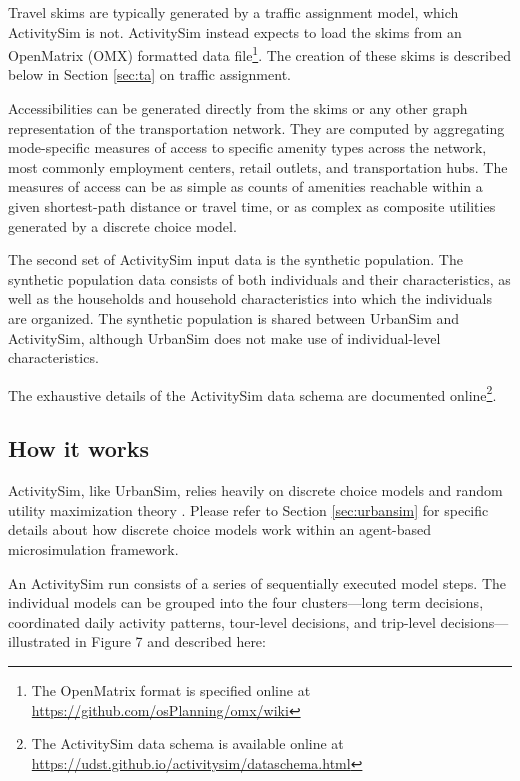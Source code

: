 Travel skims are typically generated by a traffic assignment model, which ActivitySim is not. ActivitySim instead expects to load the skims from an OpenMatrix (OMX) formatted data file\footnote{The OpenMatrix format is specified online at \url{https://github.com/osPlanning/omx/wiki}}. The creation of these skims is described below in Section \ref{sec:ta} on traffic assignment.

Accessibilities can be generated directly from the skims or any other graph representation of the transportation network. They are computed by aggregating mode-specific measures of access to specific amenity types across the network, most commonly employment centers, retail outlets, and transportation hubs. The measures of access can be as simple as counts of amenities reachable within a given shortest-path distance or travel time, or as complex as composite utilities generated by a discrete choice model. 

The second set of ActivitySim input data is the synthetic population. The synthetic population data consists of both individuals and their characteristics, as well as the households and household characteristics into which the individuals are organized. The synthetic population is shared between UrbanSim and ActivitySim, although UrbanSim does not make use of individual-level characteristics. 

The exhaustive details of the ActivitySim data schema are documented online\footnote{The ActivitySim data schema is available online at \url{https://udst.github.io/activitysim/dataschema.html}}.

\subsection{How it works}

ActivitySim, like UrbanSim, relies heavily on discrete choice models and random utility maximization theory \citep{mcfadden-1974}. Please refer to Section \ref{sec:urbansim} for specific details about how discrete choice models work within an agent-based microsimulation framework.

An ActivitySim run consists of a series of sequentially executed model steps. The individual models can be grouped into the four clusters---long term decisions, coordinated daily activity patterns, tour-level decisions, and trip-level decisions---illustrated in Figure 7 and described here:


